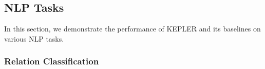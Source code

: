 \subsection{NLP Tasks}
\label{sec:nlpexp}
In this section, we demonstrate the performance of KEPLER and its baselines on various NLP tasks. 

\begin{comment}
\begin{table}[t]
    \centering
        \begin{adjustbox}{max width=0.98\linewidth}

        \tablefont
    \begin{tabular}{lccc}
        \toprule
        \textbf{Model} & \textbf{P} & \textbf{R} & \textbf{F-1} \\
        \midrule
        BERT &  &  &  \\
        ERNIE &  &  &  \\
        KnowBert &  &  &  \\
        BERT-LARGE & - & - &  \\
        MTB & - & - &  \\
        RoBERTa &  &  &  \\
        \RERNIE &  &  &  \\
        \RKNOWBERT &  &  &  \\ 
        \midrule
        Our RoBERTa &  &  &  \\
        KEPLER-Wiki &  &  &  \\
        KEPLER-WordNet &  &  &  \\
        KEPLER-W+W &  &  &  \\
        KEPLER-Rel &  &  &  \\
        KEPLER-Cond &  &  &  \\
        KEPLER-OnlyDesc &  &  &  \\
        KEPLER-KE &  &  &  \\
        \bottomrule
    \end{tabular}
    \end{adjustbox}
    \caption{Precision, recall and F-1 scores on TACRED (\%). KnowBert results are different with the original paper since different task settings are used.}
    \label{tab:tacred}
\end{table}
\end{comment}





\subsubsection*{Relation Classification}

